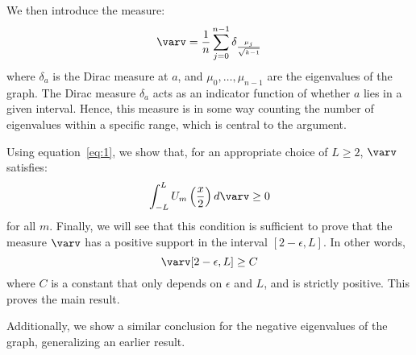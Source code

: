 \documentclass[11pt]{article}
\theoremstyle{definition}
\begin{document}
    We then introduce the measure:
    $$\varv = \frac{1}{n} \sum^{n-1}_{j=0} \delta_{\frac{\mu_j}{\sqrt{k-1}}}$$
    where $\delta_a$ is the Dirac measure at $a$, and $\mu_0, \dots, \mu_{n-1}$ are the eigenvalues of the graph.
    The Dirac measure $\delta_a$ acts as an indicator function of whether $a$ lies in a given interval.
    Hence, this measure is in some way counting the number of eigenvalues within a specific range, which is central to the argument.
    \newline

    Using equation~\eqref{eq:1}, we show that, for an appropriate choice of $L \geq 2$, $\varv$ satisfies:
    $$\int_{-L}^L U_m\left(\frac{x}{2}\right) d\varv \geq 0$$
    for all $m$.
    Finally, we will see that this condition is sufficient to prove that the measure $\varv$ has a positive support in the interval $[2-\epsilon, L]$.
    In other words,
    $$\varv[2-\epsilon, L] \geq C$$
    where $C$ is a constant that only depends on $\epsilon$ and $L$, and is strictly positive.
    This proves the main result.
    \newline

    Additionally, we show a similar conclusion for the negative eigenvalues of the graph, generalizing an earlier result.
\end{document}

